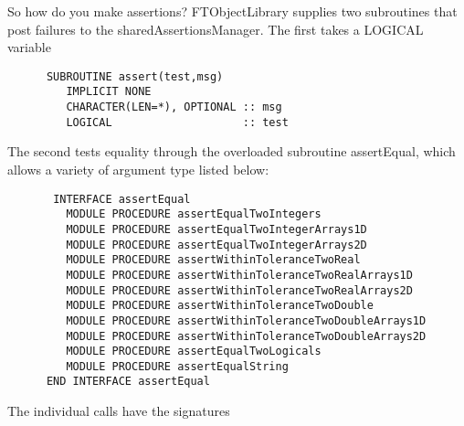 \documentclass[9pt]{article}
\begin{document}
So how do you make assertions? FTObjectLibrary supplies two subroutines that post 
failures to the sharedAssertionsManager. The first takes a LOGICAL variable
	{\color{blue}\begin{verbatim}
      SUBROUTINE assert(test,msg)  
         IMPLICIT NONE
         CHARACTER(LEN=*), OPTIONAL :: msg
         LOGICAL                    :: test
	\end{verbatim}}
The second tests equality through the overloaded subroutine assertEqual, which allows a variety 
of argument type listed below:
	{\color{blue}\begin{verbatim}
       INTERFACE assertEqual
         MODULE PROCEDURE assertEqualTwoIntegers
         MODULE PROCEDURE assertEqualTwoIntegerArrays1D
         MODULE PROCEDURE assertEqualTwoIntegerArrays2D
         MODULE PROCEDURE assertWithinToleranceTwoReal
         MODULE PROCEDURE assertWithinToleranceTwoRealArrays1D
         MODULE PROCEDURE assertWithinToleranceTwoRealArrays2D
         MODULE PROCEDURE assertWithinToleranceTwoDouble
         MODULE PROCEDURE assertWithinToleranceTwoDoubleArrays1D
         MODULE PROCEDURE assertWithinToleranceTwoDoubleArrays2D
         MODULE PROCEDURE assertEqualTwoLogicals
         MODULE PROCEDURE assertEqualString
      END INTERFACE assertEqual
	\end{verbatim}}
The individual calls have the signatures
\end{document}
